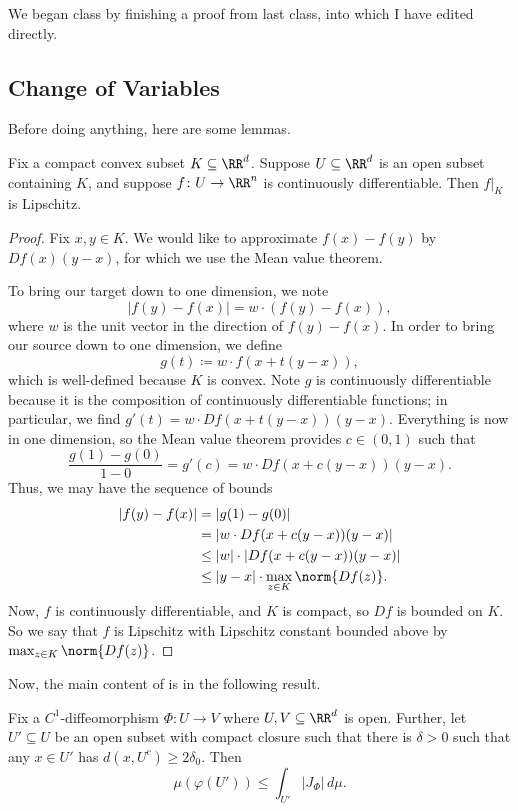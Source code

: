 \documentclass[../notes.tex]{subfiles}
\begin{document}
We began class by finishing a proof from last class, into which I have edited directly.

\subsection{Change of Variables}
Before doing anything, here are some lemmas.
\begin{lemma} \label{lem:compact-convex-to-lip}
	Fix a compact convex subset $K\subseteq\RR^d$. Suppose $U\subseteq\RR^d$ is an open subset containing $K$, and suppose $f\colon U\to\RR^n$ is continuously differentiable. Then $f|_K$ is Lipschitz.
\end{lemma}
\begin{proof}
	Fix $x,y\in K$. We would like to approximate $f(x)-f(y)$ by $Df(x)(y-x)$, for which we use the Mean value theorem.
	
	To bring our target down to one dimension, we note
	\[\left|f(y)-f(x)\right|=w\cdot(f(y)-f(x)),\]
	where $w$ is the unit vector in the direction of $f(y)-f(x)$. In order to bring our source down to one dimension, we define
	\[g(t)\coloneqq w\cdot f(x+t(y-x)),\]
	which is well-defined because $K$ is convex. Note $g$ is continuously differentiable because it is the composition of continuously differentiable functions; in particular, we find $g'(t)=w\cdot Df(x+t(y-x))(y-x)$. Everything is now in one dimension, so the Mean value theorem provides $c\in(0,1)$ such that
	\[\frac{g(1)-g(0)}{1-0}=g'(c)=w\cdot Df(x+c(y-x))(y-x).\]
	Thus, we may have the sequence of bounds
	\begin{align*}
		\left|f(y)-f(x)\right| &= \left|g(1)-g(0)\right| \\
		&= \left|w\cdot Df(x+c(y-x))(y-x)\right| \\
		&\le \left|w\right|\cdot\left|Df(x+c(y-x))(y-x)\right| \\
		&\le \left|y-x\right|\cdot\max_{z\in K}\norm{Df(z)}.
	\end{align*}
	Now, $f$ is continuously differentiable, and $K$ is compact, so $Df$ is bounded on $K$. So we say that $f$ is Lipschitz with Lipschitz constant bounded above by $\max_{z\in K}\norm{Df(z)}$.
\end{proof}
Now, the main content of  is in the following result.
\begin{lemma} \label{lem:bound-change-vars}
	Fix a $C^1$-diffeomorphism $\Phi\colon U\to V$ where $U,V\subseteq\RR^d$ is open. Further, let $U'\subseteq U$ be an open subset with compact closure such that there is $\delta>0$ such that any $x\in U'$ has $d(x,U^c)\ge2\delta_0$. Then
	\[\mu(\varphi(U'))\le\int_{U'}\left|J_\Phi\right|\,d\mu.\]
\end{lemma}
\end{document}
